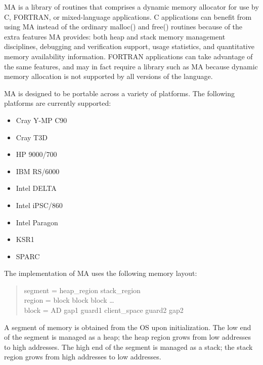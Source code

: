 
\setlength{\topmargin}{0in}
\setlength{\headheight}{0in}
\setlength{\headsep}{0in}
\setlength{\topskip}{0in}
\setlength{\textheight}{8.5in}
\setlength{\footheight}{10pt}
\setlength{\footskip}{0.5in}

\setlength{\textwidth}{6.5in}
\setlength{\oddsidemargin}{0in}
\setlength{\evensidemargin}{0in}
\setlength{\marginparwidth}{0in}
\setlength{\parindent}{0in}



MA is a library of routines that comprises a dynamic memory allocator
for use by C, FORTRAN, or mixed-language applications.  C applications
can benefit from using MA instead of the ordinary malloc() and free()
routines because of the extra features MA provides:  both heap and
stack memory management disciplines, debugging and verification
support, usage statistics, and quantitative memory availability
information.  FORTRAN applications can take advantage of the same
features, and may in fact require a library such as MA because dynamic
memory allocation is not supported by all versions of the language.

MA is designed to be portable across a variety of platforms.
The following platforms are currently supported:

\begin{itemize}
\item Cray Y-MP C90
\item Cray T3D
\item HP 9000/700
\item IBM RS/6000
\item Intel DELTA
\item Intel iPSC/860
\item Intel Paragon
\item KSR1
\item SPARC
\end{itemize}

The implementation of MA uses the following memory layout:

\begin{quote}
segment = heap\_region stack\_region \\
region = block block block \ldots \\
block = AD gap1 guard1 client\_space guard2 gap2
\end{quote}

A segment of memory is obtained from the OS upon initialization.
The low end of the segment is managed as a heap; the heap region
grows from low addresses to high addresses.  The high end of the
segment is managed as a stack; the stack region grows from high
addresses to low addresses.

